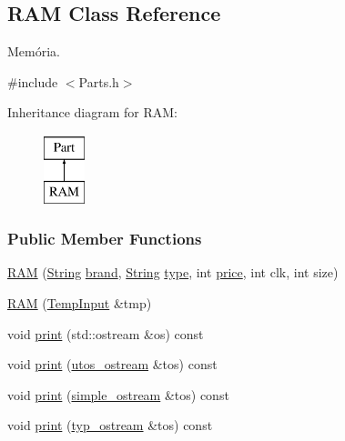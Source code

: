 \subsection{R\+AM Class Reference}
\label{class_r_a_m}


Memória.  




{\ttfamily \#include $<$Parts.\+h$>$}

Inheritance diagram for R\+AM\+:\begin{figure}[H]
\begin{center}
\leavevmode
\includegraphics[height=2.000000cm]{class_r_a_m}
\end{center}
\end{figure}
\subsubsection*{Public Member Functions}
\begin{DoxyCompactItemize}
\item 
\mbox{\hyperlink{class_r_a_m_a1869d6bd505e7fb58b809270626c82f2}{R\+AM}} (\mbox{\hyperlink{class_string}{String}} \mbox{\hyperlink{class_part_ae06f2fdeb7fbbdb229a7aca151f3e341}{brand}}, \mbox{\hyperlink{class_string}{String}} \mbox{\hyperlink{class_part_a101dbcc5c4b21564df7414c7eb0eae88}{type}}, int \mbox{\hyperlink{class_part_a8e71223aed1da95a974f33d8d6c91bb1}{price}}, int clk, int size)
\item 
\mbox{\hyperlink{class_r_a_m_afbdf895c5aa8cfce8f24197b89a9d82d}{R\+AM}} (\mbox{\hyperlink{struct_temp_input}{Temp\+Input}} \&tmp)
\item 
void \mbox{\hyperlink{class_r_a_m_a2f226659cbc23f841d73525572ba9574}{print}} (std\+::ostream \&os) const
\item 
void \mbox{\hyperlink{class_r_a_m_a11a874dd6cf99454efd6b7a1d20a3737}{print}} (\mbox{\hyperlink{structutos__ostream}{utos\+\_\+ostream}} \&tos) const
\item 
void \mbox{\hyperlink{class_r_a_m_ac2d5a8bd858289b6679e429bbe15fb20}{print}} (\mbox{\hyperlink{structsimple__ostream}{simple\+\_\+ostream}} \&tos) const
\item 
void \mbox{\hyperlink{class_r_a_m_ad43f71c742f078c98ab7fd9a26420c97}{print}} (\mbox{\hyperlink{structtyp__ostream}{typ\+\_\+ostream}} \&tos) const
\end{DoxyCompactItemize}

